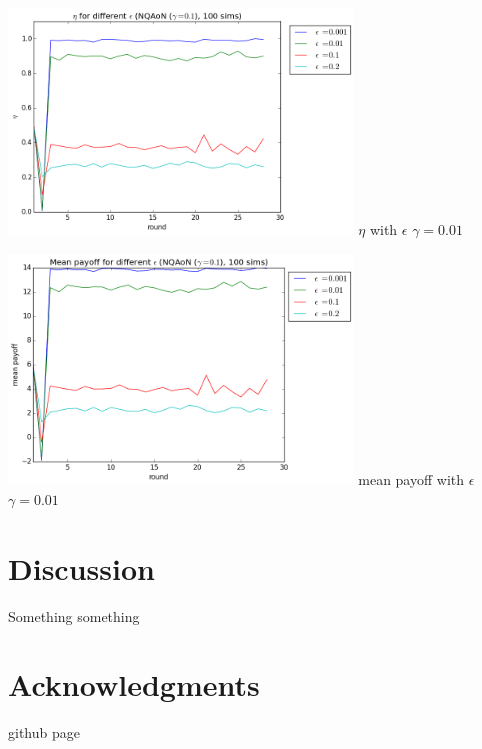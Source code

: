 \documentclass[letterpaper]{article}
\begin{document}
\includegraphics[width=3.6in,angle=0]{img/cfraction_epsilon_nqaongamma01.png}
 {$\eta$ with $\epsilon$ $\gamma=0.01$}
\label{fig10}

\includegraphics[width=3.6in,angle=0]{img/meanpayoff_epsilon_nqaongamma01.png}
 {mean payoff with $\epsilon$ $\gamma=0.01$}
\label{fig11}

\section{Discussion}
Something something

\section{Acknowledgments}
github page

\footnotesize



\end{document}
